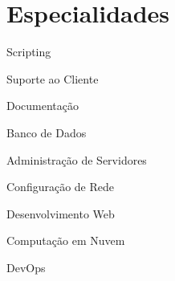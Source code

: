 \section{Especialidades}
\vspace{.5em}

\begin{center}
\begin{minipage}{0.8\textwidth}
\begin{multicols}{3}
\begin{zitemize}
  \item Scripting
  \item Suporte ao Cliente
  \item Documentação
  \item Banco de Dados
  \item Administração de Servidores
  \item Configuração de Rede
  \item Desenvolvimento Web
  \item Computação em Nuvem
  \item DevOps
\end{zitemize}
\end{multicols}
\end{minipage}
\end{center}

